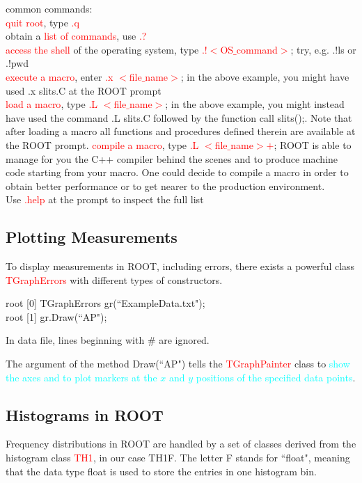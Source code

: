 \documentclass[12pt,a4paper]{article}
\begin{document}
common commands: \\
\textcolor{red}{quit root}, type \textcolor{red}{.q} \\
obtain a \textcolor{red}{list of commands}, use \textcolor{red}{.?} \\
\textcolor{red}{access the shell} of the operating system, type \textcolor{red}{.!$<$OS$\_$command$>$}; try, e.g. .!ls or .!pwd \\
\textcolor{red}{execute a macro}, enter \textcolor{red}{.x $<$file$\_$name$>$}; in the above example, you might have used .x slits.C at the ROOT prompt \\
\textcolor{red}{load a macro}, type \textcolor{red}{.L $<$file$\_$name$>$}; in the above example, you might instead have used the command .L slits.C followed by the function call slits();. Note that after loading a macro all functions and procedures defined therein are available at the ROOT prompt.
\textcolor{red}{compile a macro}, type \textcolor{red}{.L $<$file$\_$name$>+$}; ROOT is able to manage for you the C++ compiler behind the scenes and to produce machine code starting from your macro. One could decide to compile a macro in order to obtain
better performance or to get nearer to the production environment. \\
Use \textcolor{red}{.help} at the prompt to inspect the full list

\subsection{Plotting Measurements}
To display measurements in ROOT, including errors, there exists a powerful class \textcolor{red}{TGraphErrors} with different types of constructors. 

root [0] TGraphErrors gr(``ExampleData.txt"); \\
root [1] gr.Draw(``AP");

In data file, lines beginning with $\#$ are ignored.

The argument of the method Draw(``AP") tells the \textcolor{red}{TGraphPainter} class to \textcolor{cyan}{show the axes and to plot markers at the $x$ and $y$ positions of the specified data points}. 


\subsection{Histograms in ROOT}
Frequency distributions in ROOT are handled by a set of classes derived from the histogram class \textcolor{red}{TH1}, in our case TH1F. The letter F stands for ``float", meaning that the data type float is used to store the entries in one histogram bin.
\end{document}
